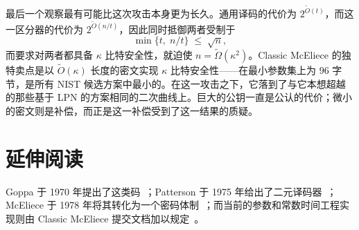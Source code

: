 最后一个观察最有可能比这次攻击本身更为长久。通用译码的代价为 $2^{\tilde{O}(t)}$，而这一区分器的代价为 $2^{\tilde{O}(n/t)}$，因此同时抵御两者受制于
\[
\min\{t,\; n/t\} \;\le\; \sqrt{n},
\]
而要求对两者都具备 $\kappa$ 比特安全性，就迫使 $n = \tilde{\Omega}(\kappa^2)$。Classic McEliece 的独特卖点是以 $\tilde{O}(\kappa)$ 长度的密文实现 $\kappa$ 比特安全性——在最小参数集上为 96 字节，是所有 NIST 候选方案中最小的。在这一攻击之下，它落到了与它本想超越的那些基于 LPN 的方案相同的二次曲线上。巨大的公钥一直是公认的代价；微小的密文则是补偿，而正是这一补偿受到了这一结果的质疑。

\section*{延伸阅读}
Goppa 于 1970 年提出了这类码~\cite{goppa1970}；Patterson 于 1975 年给出了二元译码器~\cite{patterson1975}；McEliece 于 1978 年将其转化为一个密码体制~\cite{mceliece1978}；而当前的参数和常数时间工程实现则由 Classic McEliece 提交文档加以规定~\cite{classicmceliece}。

\printbibliography[heading=chapterrefs]
